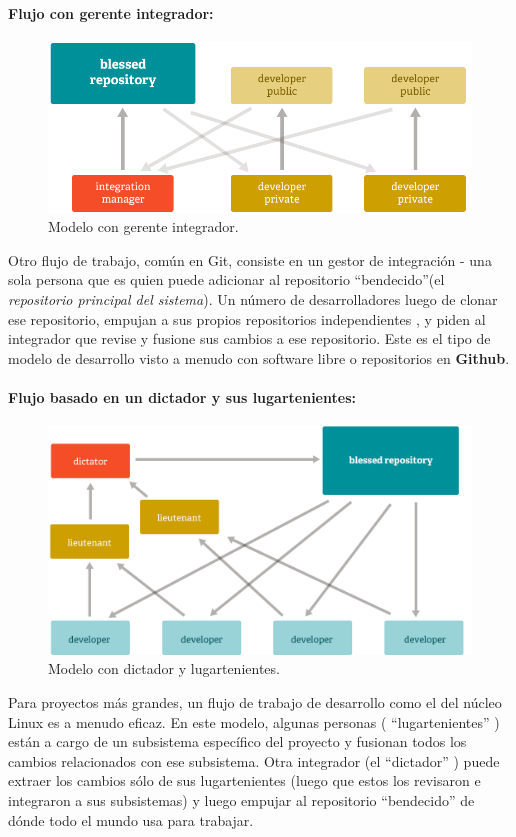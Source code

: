\documentclass[12pt, spanish, oneside, onecolumn, a4paper]{report}
\begin{document}
\paragraph{Flujo con gerente integrador:} 
\begin{figure} 
  \begin{center} 
    \includegraphics[width=.6\textwidth,keepaspectratio=true]{workflow-b.png} 
  \end{center} 
  \caption{Modelo con gerente integrador.} 
\end{figure} Otro flujo de trabajo, común en Git, consiste en un gestor de integración - una sola persona que es quien puede adicionar al repositorio ``bendecido''(el \emph{repositorio principal del sistema}). Un número de desarrolladores luego de clonar ese repositorio, empujan a sus propios repositorios independientes , y piden al integrador que revise y fusione sus cambios a ese repositorio. Este es el tipo de modelo de desarrollo visto a menudo con software libre o repositorios en \textbf{Github}. 
\paragraph{Flujo basado en un dictador y sus lugartenientes:} 
\begin{figure} 
  \begin{center} 
    \includegraphics[width=.6\textwidth,keepaspectratio=true]{workflow-c.png} 
  \end{center} 
  \caption{Modelo con dictador y lugartenientes.} 
\end{figure} Para proyectos más grandes, un flujo de trabajo de desarrollo como el del núcleo Linux es a menudo eficaz. En este modelo, algunas personas ( ``lugartenientes'' ) están a cargo de un subsistema específico del proyecto y fusionan todos los cambios relacionados con ese subsistema. Otra integrador (el ``dictador'' ) puede extraer los cambios sólo de sus lugartenientes (luego que estos los revisaron e integraron a sus subsistemas) y luego empujar al repositorio ``bendecido'' de dónde todo el mundo usa para trabajar. 
\clearpage 
\end{document}
